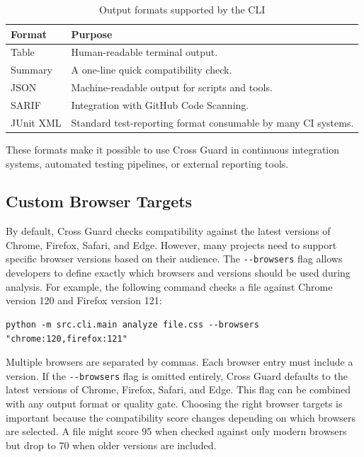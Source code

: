 \begin{table}[H]
    \centering
    \begin{tabular}{|l|l|}
        \hline
        \textbf{Format} & \textbf{Purpose} \\
        \hline \hline
        Table     & Human-readable terminal output. \\ \hline
        Summary   & A one-line quick compatibility check. \\ \hline
        JSON      & Machine-readable output for scripts and tools. \\ \hline
        SARIF     & Integration with GitHub Code Scanning. \\ \hline
        JUnit XML & Standard test-reporting format consumable by many CI systems. \\ \hline
    \end{tabular}
    \caption{Output formats supported by the CLI}
    \label{tab:cli-formats}
\end{table}

These formats make it possible to use Cross Guard in continuous integration systems, automated testing pipelines, or external reporting tools.

\subsection{Custom Browser Targets}

By default, Cross Guard checks compatibility against the latest versions of Chrome, Firefox, Safari, and Edge. However, many projects need to support specific browser versions based on their audience. The \texttt{-{}-browsers} flag allows developers to define exactly which browsers and versions should be used during analysis. For example, the following command checks a file against Chrome version 120 and Firefox version 121:

\begin{lstlisting}[caption={Analyze against specific browser versions}, basicstyle=\ttfamily\small]
python -m src.cli.main analyze file.css --browsers "chrome:120,firefox:121"
\end{lstlisting}

Multiple browsers are separated by commas. Each browser entry must include a version. If the \texttt{-{}-browsers} flag is omitted entirely, Cross Guard defaults to the latest versions of Chrome, Firefox, Safari, and Edge. This flag can be combined with any output format or quality gate. Choosing the right browser targets is important because the compatibility score changes depending on which browsers are selected. A file might score 95 when checked against only modern browsers but drop to 70 when older versions are included.
\newpage
